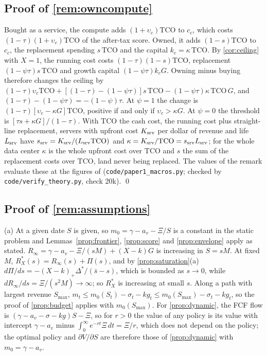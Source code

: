 \subsection*{Proof of \autoref{rem:owncompute}}

Bought as a service, the compute adds $(1+\upsilon_c)\mathrm{TCO}$ to $c_c$, which costs $(1-\tau)(1+\upsilon_c)\mathrm{TCO}$ of the after-tax score. Owned, it adds $(1-s)\mathrm{TCO}$ to $c_c$, the replacement spending $s\,\mathrm{TCO}$ and the capital $k_c=\kappa\,\mathrm{TCO}$. By \autoref{cor:ceiling} with $X=1$, the running cost costs $(1-\tau)(1-s)\mathrm{TCO}$, replacement $(1-\psi\tau)s\,\mathrm{TCO}$ and growth capital $(1-\psi\tau)k_cG$. Owning minus buying therefore changes the ceiling by $(1-\tau)\upsilon_c\mathrm{TCO}+[(1-\tau)-(1-\psi\tau)]s\,\mathrm{TCO}-(1-\psi\tau)\kappa\,\mathrm{TCO}\,G$, and $(1-\tau)-(1-\psi\tau)=-(1-\psi)\tau$. At $\psi=1$ the change is $(1-\tau)[\upsilon_c-\kappa G]\mathrm{TCO}$, positive if and only if $\upsilon_c>\kappa G$. At $\psi=0$ the threshold is $[\tau s+\kappa G]/(1-\tau)$. With $\mathrm{TCO}$ the cash cost, the running cost plus straight-line replacement, servers with upfront cost $K_{\rm srv}$ per dollar of revenue and life $L_{\rm srv}$ have $s_{\rm srv}=K_{\rm srv}/(L_{\rm srv}\mathrm{TCO})$ and $\kappa=K_{\rm srv}/\mathrm{TCO}=s_{\rm srv}L_{\rm srv}$; for the whole data center $\kappa$ is the whole upfront cost over $\mathrm{TCO}$ and $s$ the sum of the replacement costs over $\mathrm{TCO}$, land never being replaced. The values of the remark evaluate these at the figures of \citet{michael2026servers} (\texttt{code/paper1\_macros.py}; checked by \texttt{code/verify\_theory.py}, check 20k). \qed

\subsection*{Proof of \autoref{rem:assumptions}}

(a) At a given date $S$ is given, so $m_0=\gamma-a_v-\Xi/S$ is a constant in the static problem and Lemmas~\ref{prop:frontier}, \ref{prop:score} and \ref{prop:envelope} apply as stated. $R_\infty=\gamma-a_v-\Xi/(sM)+(X-k)G$ is increasing in $S=sM$. At fixed $M$, $R_X^*(s)=R_\infty(s)+\Pi(s)$, and by \autoref{prop:saturation}(a) $d\Pi/ds=-(X-k)_+\Delta^*/(\bar s-s)$, which is bounded as $s\to 0$, while $d R_\infty/ds=\Xi/(s^2M)\to\infty$; so $R_X^*$ is increasing at small $s$. Along a path with largest revenue $S_{\max}$, $m_t\le m_0(S_t)-\sigma_t-kg_t\le m_0(S_{\max})-\sigma_t-kg_t$, so the proof of \autoref{prop:budget} applies with $m_0(S_{\max})$. For \autoref{prop:dynamic}, the FCF flow is $(\gamma-a_v-\sigma-kg)S-\Xi$, so for $r>0$ the value of any policy is its value with intercept $\gamma-a_v$ minus $\int_0^\infty e^{-rt}\Xi\,dt=\Xi/r$, which does not depend on the policy; the optimal policy and $\partial V/\partial S$ are therefore those of \autoref{prop:dynamic} with $m_0=\gamma-a_v$.

